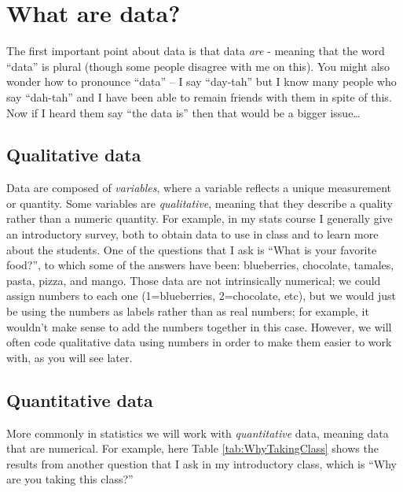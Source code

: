 \documentclass[12pt,]{book}
\theoremstyle{definition}
\theoremstyle{definition}
\theoremstyle{definition}
\theoremstyle{remark}
\begin{document}
\hypertarget{what-are-data}{%
\section{What are data?}\label{what-are-data}}

The first important point about data is that data \emph{are} - meaning that the word ``data'' is plural (though some people disagree with me on this). You might also wonder how to pronounce ``data'' -- I say ``day-tah'' but I know many people who say ``dah-tah'' and I have been able to remain friends with them in spite of this. Now if I heard them say ``the data is'' then that would be a bigger issue\ldots{}

\hypertarget{qualitative-data}{%
\subsection{Qualitative data}\label{qualitative-data}}

Data are composed of \emph{variables}, where a variable reflects a unique measurement or quantity. Some variables are \emph{qualitative}, meaning that they describe a quality rather than a numeric quantity. For example, in my stats course I generally give an introductory survey, both to obtain data to use in class and to learn more about the students. One of the questions that I ask is ``What is your favorite food?'', to which some of the answers have been: blueberries, chocolate, tamales, pasta, pizza, and mango. Those data are not intrinsically numerical; we could assign numbers to each one (1=blueberries, 2=chocolate, etc), but we would just be using the numbers as labels rather than as real numbers; for example, it wouldn't make sense to add the numbers together in this case. However, we will often code qualitative data using numbers in order to make them easier to work with, as you will see later.

\hypertarget{quantitative-data}{%
\subsection{Quantitative data}\label{quantitative-data}}

More commonly in statistics we will work with \emph{quantitative} data, meaning data that are numerical. For example, here Table \ref{tab:WhyTakingClass} shows the results from another question that I ask in my introductory class, which is ``Why are you taking this class?''
\end{document}

